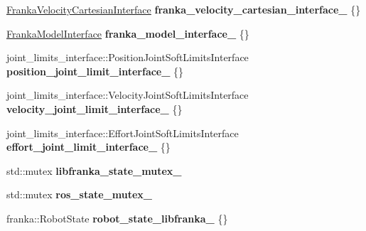 \begin{DoxyCompactItemize}
\mbox{\label{classfranka__hw_1_1_franka_h_w_af8d77bce759ddf1db22a22a996181ba9}} 
\hyperlink{classfranka__hw_1_1_franka_velocity_cartesian_interface}{Franka\+Velocity\+Cartesian\+Interface} {\bfseries franka\+\_\+velocity\+\_\+cartesian\+\_\+interface\+\_\+} \{\}
\item 
\mbox{\label{classfranka__hw_1_1_franka_h_w_a8480f1a38f8a01fb10670f9d300ed037}} 
\hyperlink{classfranka__hw_1_1_franka_model_interface}{Franka\+Model\+Interface} {\bfseries franka\+\_\+model\+\_\+interface\+\_\+} \{\}
\item 
\mbox{\label{classfranka__hw_1_1_franka_h_w_a0453d8d00992ae08ddd47083a21abcc8}} 
joint\+\_\+limits\+\_\+interface\+::\+Position\+Joint\+Soft\+Limits\+Interface {\bfseries position\+\_\+joint\+\_\+limit\+\_\+interface\+\_\+} \{\}
\item 
\mbox{\label{classfranka__hw_1_1_franka_h_w_a4e85e4440436f97a169553d281049e4e}} 
joint\+\_\+limits\+\_\+interface\+::\+Velocity\+Joint\+Soft\+Limits\+Interface {\bfseries velocity\+\_\+joint\+\_\+limit\+\_\+interface\+\_\+} \{\}
\item 
\mbox{\label{classfranka__hw_1_1_franka_h_w_a3545598adde92a2cd78af121bf40f24b}} 
joint\+\_\+limits\+\_\+interface\+::\+Effort\+Joint\+Soft\+Limits\+Interface {\bfseries effort\+\_\+joint\+\_\+limit\+\_\+interface\+\_\+} \{\}
\item 
\mbox{\label{classfranka__hw_1_1_franka_h_w_af2de5dd88993549670b2345fbf70c539}} 
std\+::mutex {\bfseries libfranka\+\_\+state\+\_\+mutex\+\_\+}
\item 
\mbox{\label{classfranka__hw_1_1_franka_h_w_a80e2b2029bc0a45bb28594435097434d}} 
std\+::mutex {\bfseries ros\+\_\+state\+\_\+mutex\+\_\+}
\item 
\mbox{\label{classfranka__hw_1_1_franka_h_w_afe80f4d54e4f6aa47534ebbcb2382ecb}} 
franka\+::\+Robot\+State {\bfseries robot\+\_\+state\+\_\+libfranka\+\_\+} \{\}
\item 

\end{DoxyCompactItemize}

